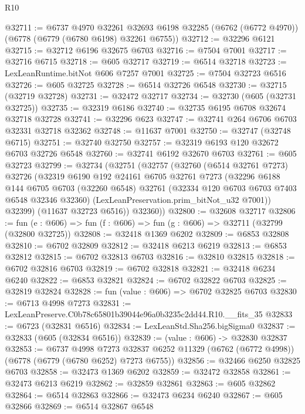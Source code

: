 \begin{lexlean}{R10}
\begin{coremodule}
@32711 := @6737
    @4970
    @32261
    @32693
    @6198
    @32285
    (@6762 (@6772 @4970))
    (@6778 (@6779 (@6780 @6198) @32261 @6755))
@32712 := @32296 @6121
@32715 := @32712 @6196 @32675 @6703
@32716 := @7504 @7001
@32717 := @32716 @6715
@32718 := @605 @32717
@32719 := @6514 @32718
@32723 := LexLeanRuntime.bitNot @606 @7257 @7001
@32725 := @7504 @32723 @6516
@32726 := @605 @32725
@32728 := @6514 @32726 @6548
@32730 := @32715 (@32719 @32728)
@32731 := @32472 @32717
@32734 := @32730 (@605 (@32731 @32725))
@32735 := @32319 @6186
@32740 := @32735 @6195 @6708 @32674 @32718 @32728
@32741 := @32296 @623
@32747 := @32741 @264 @6706 @6703 @32331 @32718 @32362
@32748 := @11637 @7001
@32750 := @32747 (@32748 @6715)
@32751 := @32740 @32750
@32757 := @32319 @6193 @120 @32672 @6703 @32726 @6548
@32760 := @32741 @6192 @32670 @6703
@32761 := @605 @32723
@32799 := @32734
    (@32751
      (@32757
        (@32760
          (@6514 @32761 @7273)
          @32726
          (@32319
            @6190
            @192
            @24161
            @6705
            @32761
            @7273
            (@32296
              @6188
              @144
              @6705
              @6703
              (@32260 @6548)
              @32761
              (@32334 @120 @6703 @6703 @7403 @6548 @32346 @32360)
              (LexLeanPreservation.prim_bitNot_u32 @7001))
            @32399)
          (@11637 @32723 @6516))
        @32360))
@32800 := @32608 @32717
@32806 := fun (e : @606) => fun (f : @606) => fun (g : @606) => @32711 (@32799 (@32800 @32725))
@32808 := @32418 @1369 @6202
@32809 := @6853 @32808
@32810 := @6702 @32809
@32812 := @32418 @6213 @6219
@32813 := @6853 @32812
@32815 := @6702 @32813 @6703
@32816 := @32810 @32815
@32818 := @6702 @32816 @6703
@32819 := @6702 @32818
@32821 := @32418 @6234 @6240
@32822 := @6853 @32821
@32824 := @6702 @32822 @6703
@32825 := @32819 @32824
@32828 := fun (value : @606) => @6702 @32825 @6703
@32830 := @6713 @4998 @7273
@32831 := LexLeanPreserve.C0b78c65801b39044e96a0b3235c2dd44.R10.__fits_35
@32833 := @6723 (@32831 @6516)
@32834 := LexLeanStd.Sha256.bigSigma0
@32837 := @32833 (@605 (@32834 @6516))
@32839 := (value : @606) -> @32830 @32837
@32853 := @6737
    @4998
    @7273
    @32837
    @6252
    @11329
    (@6762 (@6772 @4998))
    (@6778 (@6779 (@6780 @6252) @7273 @6755))
@32856 := @32466 @6250 @32825 @6703
@32858 := @32473 @1369 @6202
@32859 := @32472 @32858
@32861 := @32473 @6213 @6219
@32862 := @32859 @32861
@32863 := @605 @32862
@32864 := @6514 @32863
@32866 := @32473 @6234 @6240
@32867 := @605 @32866
@32869 := @6514 @32867 @6548

\end{coremodule}
\end{lexlean}
